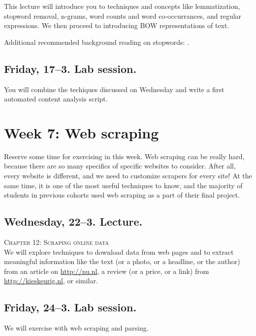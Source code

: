 This lecture will introduce you to techniques and concepts like lemmatization, stopword removal, n-grams, word counts and word co-occurrances, and regular expressions. We then proceed to introducing BOW representations of text.

Additional recommended background reading on stopwords: \cite{Nothman2018}.


\subsection*{Friday, 17--3. Lab session.}
You will combine the techiques discussed on Wednesday and write a first automated content analysis script.








\section*{Week 7: Web scraping}
Reserve some time for exercising in this week. Web scraping can be really hard, because there are so many specifics of specific websites to consider. After all, every website is different, and we need to customize scrapers for every site! At the same time, it is one of the most useful techniques to know, and the majority of students in previous cohorts used web scraping as a part of their final project.


\subsection*{Wednesday, 22--3. Lecture.}
\textsc{ Chapter 12: Scraping online data}\\
We will explore techniques to download data from web pages and to extract meaningful information like the text (or a photo, or a headline, or the author) from an article on \url{http://nu.nl}, a review (or a price, or a link) from \url{http://kieskeurig.nl}, or similar.

\subsection*{Friday, 24--3. Lab session.}
We will exercise with web scraping and parsing.






